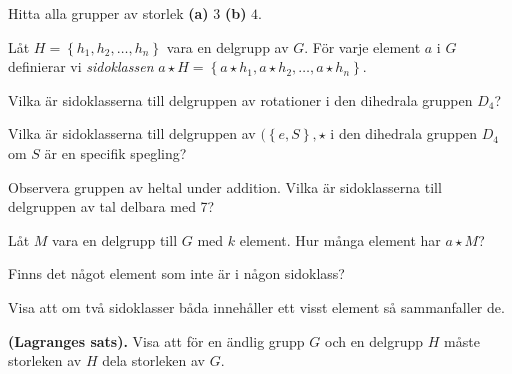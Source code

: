 \documentclass[11pt,fleqn]{book} %
\begin{document}
\begin{problem}
	Hitta alla grupper av storlek \textbf{(a)} \(3\) \textbf{(b)} \(4\).
\end{problem}

\begin{definition} Låt \(H = \left\{h_1, h_2, \dots, h_n\right\}\) vara en delgrupp av \(G\). För varje element \(a\) i \(G\) definierar vi \textit{sidoklassen} \(a \star H = \left\{a  \star h_1, a \star h_2, \dots, a \star h_n\right\}\).
\end{definition}

\begin{problem}
  Vilka är sidoklasserna till delgruppen av rotationer i den dihedrala gruppen \(D_4\)?
\end{problem}

\begin{problem}
  Vilka är sidoklasserna till delgruppen av \((\left\{e, S\right\},  \star \) i den dihedrala gruppen \(D_4\) om \(S\) är en specifik spegling?
\end{problem}

\begin{problem}
  Observera gruppen av heltal under addition. Vilka är sidoklasserna till delgruppen av tal delbara med 7?
\end{problem}

\begin{problem}
  Låt \(M\) vara en delgrupp till \(G\) med \(k\) element. Hur många element har \(a  \star M\)?
\end{problem}

\begin{problem} 
	Finns det något element som inte är i någon sidoklass?
\end{problem}

\begin{problem}
	Visa att om två sidoklasser båda innehåller ett visst element så sammanfaller de.
\end{problem}

\begin{problem} \textbf{(Lagranges sats).} 
	Visa att för en ändlig grupp \(G\) och en delgrupp \(H\) måste storleken av \(H\) dela storleken av \(G\).
\end{problem}
\end{document}
